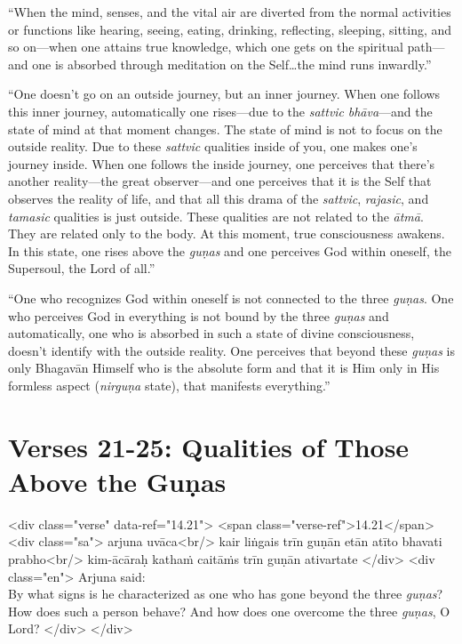 \enquote{When the mind, senses, and the vital air are diverted from the normal activities or functions like hearing, seeing, eating, drinking, reflecting, sleeping, sitting, and so on---when one attains true knowledge, which one gets on the spiritual path---and one is absorbed through meditation on the Self\ldots the mind runs inwardly.}

\enquote{One doesn’t go on an outside journey, but an inner journey. When one follows this inner journey, automatically one rises---due to the \textit{sattvic} \textit{bhāva}---and the state of mind at that moment changes. The state of mind is not to focus on the outside reality. Due to these \textit{sattvic} qualities inside of you, one makes one’s journey inside. When one follows the inside journey, one perceives that there’s another reality---the great observer---and one perceives that it is the Self that observes the reality of life, and that all this drama of the \textit{sattvic}, \textit{rajasic}, and \textit{tamasic} qualities is just outside. These qualities are not related to the \textit{ātmā}. They are related only to the body. At this moment, true consciousness awakens. In this state, one rises above the \textit{guṇas} and one perceives God within oneself, the Supersoul, the Lord of all.}

\enquote{One who recognizes God within oneself is not connected to the three \textit{guṇas}. One who perceives God in everything is not bound by the three \textit{guṇas} and automatically, one who is absorbed in such a state of divine consciousness, doesn’t identify with the outside reality. One perceives that beyond these \textit{guṇas} is only Bhagavān Himself who is the absolute form and that it is Him only in His formless aspect (\textit{nirguṇa} state), that manifests everything.}

\section{Verses 21-25: Qualities of Those Above the Guṇas}\label{sec-verses-21-25-qualities-of-those-above-the-gunas}


\begin{html}
<div class="verse" data-ref="14.21">
  <span class="verse-ref">14.21</span>
  <div class="sa">
    arjuna uvāca<br/>
    kair liṅgais trīn guṇān etān atīto bhavati prabho<br/>
    kim-ācāraḥ kathaṁ caitāṁs trīn guṇān ativartate
  </div>
  <div class="en">
    \hspace*{1em}Arjuna said: \\ By what signs is he characterized as one who has gone beyond the three \textit{guṇas}? How does such a person behave? And how does one overcome the three \textit{guṇas}, O Lord?
  </div>
</div>
\end{html}



